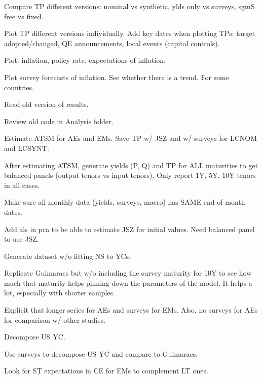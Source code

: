 \documentclass[12pt]{article}
\newcommand{\cmark}{\ding{51}}
\newcommand{\xmark}{\ding{55}}
\newcommand{\done}{\rlap{$\square$}{\raisebox{2pt}{\large\hspace{1pt}\cmark}}%
	\hspace{-2.5pt}}
\newcommand{\wontdo}{\rlap{$\square$}{\large\hspace{1pt}\xmark}}
\begin{document}
\begin{todolist}
	\item[\done] Compare TP different versions: nominal vs synthetic, ylds only vs surveys, sgmS free vs fixed. 
	\item[\done] Plot TP different versions individually. Add key dates when plotting TPs: target adopted/changed, QE announcements, local events (capital controls). 
	\item[\done] Plot: inflation, policy rate, expectations of inflation.
	\item[\done] Plot survey forecasts of inflation. See whether there is a trend. For some countries.
	\item[\done] Read old version of results.
	\item[\done] Review old code in Analysis folder.	
	\item[\done] Estimate ATSM for AEs and EMs. Save TP w/ JSZ and w/ surveys for LCNOM and LCSYNT.
	\item[\done] After estimating ATSM, generate yields (P, Q) and TP for ALL maturities to get balanced panels (output tenors vs input tenors). Only report 1Y, 5Y, 10Y tenors in all cases.
	\item[\done] Make sure all monthly data (yields, surveys, macro) has SAME end-of-month dates.
	\item[\wontdo] Add als in pca to be able to estimate JSZ for initial values. Need balanced panel to use JSZ.
	\item[\done] Generate dataset w/o fitting NS to YCs.
	\item[\done] Replicate Guimaraes but w/o including the survey maturity for 10Y to see how much that maturity helps pinning down the parameters of the model. It helps a lot, especially with shorter samples.
	\item[\done] Explicit that longer series for AEs and surveys for EMs. Also, no surveys for AEs for comparison w/ other studies. %
	\item[\done] Decompose US YC.
	\item[\done] Use surveys to decompose US YC and compare to Guimaraes.
	\item[\done] Look for ST expectations in CE for EMs to complement LT ones.
\end{todolist}
\end{document}
